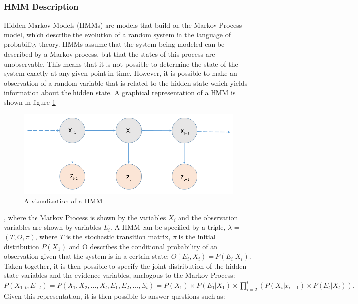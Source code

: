 \subsubsection{HMM Description}
Hidden Markov Models (HMMs) are models that build on the Markov Process model, which describe the evolution of a random system in the language of probability theory. HMMs assume that the system being modeled can be described by a Markov process, but that the states of this process are unobservable. This means that it is not possible to determine the state of the system exactly at any given point in time. However, it is possible to make an observation of a random variable that is related to the hidden state which yields information about the hidden state. A graphical representation of a HMM is shown in figure \ref{fig:hmm}
\begin{figure}[]
    \centering
    \includegraphics[width=0.8\linewidth]{Chapters/MultiAgentTargetDetection/BayesianFiltering/Figs/HMMs/HMMObservationsOnly.png}
    \caption{A visualisation of a HMM \cite{AIAMA}}
    \label{fig:hmm}
\end{figure}
, where the Markov Process is shown by the variables $X_i$ and the observation variables are shown by variables $E_i$. A HMM can be specified by a triple, $\lambda$ = $(T, O, \pi)$, where $T$ is the stochastic transition matrix, $\pi$ is the initial distribution $P(X_1)$ and O describes the conditional probability of an observation given that the system is in a certain state: $O(E_i, X_i) = P(E_{i} | X_{i})$. Taken together, it is then possible to specify the joint distribution of the hidden state variables and the evidence variables, analogous to the Markov Process: 
$
P(X_{1:t}, E_{1:t}) = P(X_1, X_2, ..., X_t, E_1, E_2, ..., E_t) = P(X_1) \times P(E_1 | X_1) \times
\prod_{i=2}^{t}{(P(X_i | x_{i-1}) \times P(E_t | X_t))}.
$Given this representation, it is then possible to answer questions such as:
